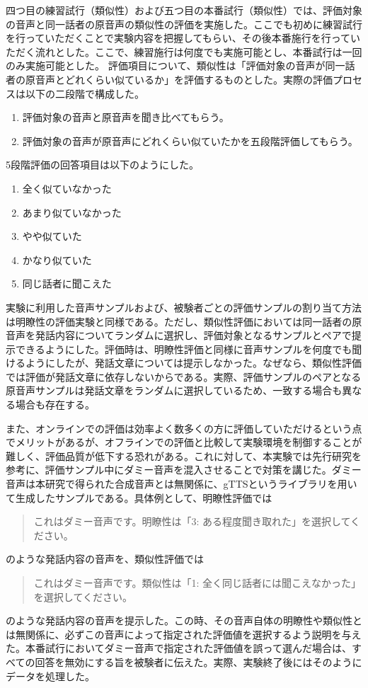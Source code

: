\documentclass[12pt]{jarticle}
\numberwithin{equation}{section}    %
\numberwithin{figure}{section}      %
\numberwithin{table}{section}      %
\begin{document}
四つ目の練習試行（類似性）および五つ目の本番試行（類似性）では、評価対象の音声と同一話者の原音声の類似性の評価を実施した。ここでも初めに練習試行を行っていただくことで実験内容を把握してもらい、その後本番施行を行っていただく流れとした。ここで、練習施行は何度でも実施可能とし、本番試行は一回のみ実施可能とした。
評価項目について、類似性は「評価対象の音声が同一話者の原音声とどれくらい似ているか」を評価するものとした。実際の評価プロセスは以下の二段階で構成した。
\begin{enumerate}
    \item 評価対象の音声と原音声を聞き比べてもらう。
    \item 評価対象の音声が原音声にどれくらい似ていたかを五段階評価してもらう。
\end{enumerate}
5段階評価の回答項目は以下のようにした。
\begin{enumerate}
    \item 全く似ていなかった
    \item あまり似ていなかった
    \item やや似ていた
    \item かなり似ていた
    \item 同じ話者に聞こえた
\end{enumerate}
実験に利用した音声サンプルおよび、被験者ごとの評価サンプルの割り当て方法は明瞭性の評価実験と同様である。ただし、類似性評価においては同一話者の原音声を発話内容についてランダムに選択し、評価対象となるサンプルとペアで提示できるようにした。評価時は、明瞭性評価と同様に音声サンプルを何度でも聞けるようにしたが、発話文章については提示しなかった。なぜなら、類似性評価では評価が発話文章に依存しないからである。実際、評価サンプルのペアとなる原音声サンプルは発話文章をランダムに選択しているため、一致する場合も異なる場合も存在する。

また、オンラインでの評価は効率よく数多くの方に評価していただけるという点でメリットがあるが、オフラインでの評価と比較して実験環境を制御することが難しく、評価品質が低下する恐れがある。これに対して、本実験では先行研究\cite{kirkland2023stuck}を参考に、評価サンプル中にダミー音声を混入させることで対策を講じた。ダミー音声は本研究で得られた合成音声とは無関係に、gTTSというライブラリを用いて生成したサンプルである。具体例として、明瞭性評価では
\begin{quote}
    これはダミー音声です。明瞭性は「3: ある程度聞き取れた」を選択してください。
\end{quote}
のような発話内容の音声を、類似性評価では
\begin{quote}
    これはダミー音声です。類似性は「1: 全く同じ話者には聞こえなかった」を選択してください。
\end{quote}
のような発話内容の音声を提示した。この時、その音声自体の明瞭性や類似性とは無関係に、必ずこの音声によって指定された評価値を選択するよう説明を与えた。本番試行においてダミー音声で指定された評価値を誤って選んだ場合は、すべての回答を無効にする旨を被験者に伝えた。実際、実験終了後にはそのようにデータを処理した。
\end{document}
